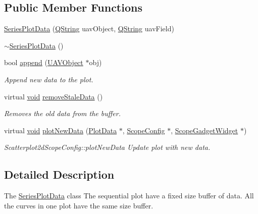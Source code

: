\subsection*{\-Public \-Member \-Functions}
\begin{DoxyCompactItemize}
\item 
\hyperlink{group___scope_plugin_ga82d1767158aa15b3c4306bc74960692e}{\-Series\-Plot\-Data} (\hyperlink{group___u_a_v_objects_plugin_gab9d252f49c333c94a72f97ce3105a32d}{\-Q\-String} uav\-Object, \hyperlink{group___u_a_v_objects_plugin_gab9d252f49c333c94a72f97ce3105a32d}{\-Q\-String} uav\-Field)
\item 
\hyperlink{group___scope_plugin_gae281a484eece3ddc571d397e576bad97}{$\sim$\-Series\-Plot\-Data} ()
\item 
bool \hyperlink{group___scope_plugin_ga3f88889724489ec42f8bc0544a3f4474}{append} (\hyperlink{class_u_a_v_object}{\-U\-A\-V\-Object} $\ast$obj)
\begin{DoxyCompactList}\small\item\em \-Append new data to the plot. \end{DoxyCompactList}\item 
virtual \hyperlink{group___u_a_v_objects_plugin_ga444cf2ff3f0ecbe028adce838d373f5c}{void} \hyperlink{group___scope_plugin_gad07a97346395d3ee7ee2d455a6d863d1}{remove\-Stale\-Data} ()
\begin{DoxyCompactList}\small\item\em \-Removes the old data from the buffer. \end{DoxyCompactList}\item 
virtual \hyperlink{group___u_a_v_objects_plugin_ga444cf2ff3f0ecbe028adce838d373f5c}{void} \hyperlink{group___scope_plugin_ga9a0a0e2cd48eeba6f77d3da8421729c4}{plot\-New\-Data} (\hyperlink{class_plot_data}{\-Plot\-Data} $\ast$, \hyperlink{class_scope_config}{\-Scope\-Config} $\ast$, \hyperlink{class_scope_gadget_widget}{\-Scope\-Gadget\-Widget} $\ast$)
\begin{DoxyCompactList}\small\item\em \-Scatterplot2d\-Scope\-Config\-::plot\-New\-Data \-Update plot with new data. \end{DoxyCompactList}\end{DoxyCompactItemize}


\subsection{\-Detailed \-Description}
\-The \hyperlink{class_series_plot_data}{\-Series\-Plot\-Data} class \-The sequential plot have a fixed size buffer of data. \-All the curves in one plot have the same size buffer. 

